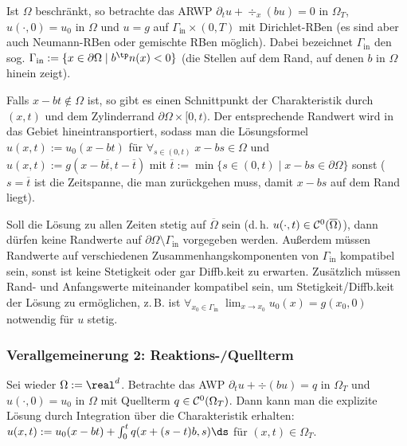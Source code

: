 \begin{Bem}
    Ist $\Omega$ beschränkt, so betrachte das ARWP
    $\partial_t u + \div_x(bu) = 0$ in $\Omega_T$,
    $u(\cdot, 0) = u_0$ in $\Omega$ und
    $u = g$ auf $\Gamma_\text{in} \times (0, T)$
    mit Dirichlet-RBen (es sind aber auch Neumann-RBen oder gemischte RBen möglich).
    Dabei bezeichnet $\Gamma_\text{in}$ den sog. 
    $\Gamma_\text{in} := \{x \in \partial\Omega \;|\; b^\tp n(x) < 0\}$
    (die Stellen auf dem Rand, auf denen $b$ in $\Omega$ hinein zeigt).
    
    Falls $x - bt \notin \Omega$ ist, so gibt es einen Schnittpunkt der Charakteristik durch
    $(x, t)$ und dem Zylinderrand $\partial\Omega \times [0, t)$.
    Der entsprechende Randwert wird in das Gebiet hineintransportiert, sodass man die Lösungsformel
    $u(x, t) := u_0(x - bt)$ für $\forall_{s \in (0, t)}\; x - bs \in \Omega$ und\\
    $u(x, t) := g(x - b\overline{t}, t - \overline{t})$ mit
    $\overline{t} := \min\{s \in (0, t) \;|\; x - bs \in \partial\Omega\}$ sonst
    ($s = \overline{t}$ ist die Zeitspanne, die man zurückgehen muss, damit $x - bs$ auf dem Rand
    liegt).
    
    Soll die Lösung zu allen Zeiten stetig auf $\overline{\Omega}$ sein
    (d.\,h. $u(\cdot, t) \in \mathcal{C}^0(\overline{\Omega})$), dann dürfen keine Randwerte auf
    $\partial\Omega \setminus \Gamma_\text{in}$ vorgegeben werden.
    Außerdem müssen Randwerte auf verschiedenen Zusammenhangskomponenten von $\Gamma_\text{in}$
    kompatibel sein, sonst ist keine Stetigkeit oder gar Diffb.keit zu erwarten.
    Zusätzlich müssen Rand- und Anfangswerte miteinander kompatibel sein, um Stetigkeit/Diffb.keit
    der Lösung zu ermöglichen, z.\,B. ist
    $\forall_{x_0 \in \Gamma_\text{in}}\; \lim_{x \to x_0} u_0(x) = g(x_0, 0)$
    notwendig für $u$ stetig.
\end{Bem}

\subsubsection{%
    Verallgemeinerung 2: Reaktions-/Quellterm%
}

\begin{Bem}
    Sei wieder $\Omega := \real^d$.
    Betrachte das AWP $\partial_t u + \div(bu) = q$ in $\Omega_T$ und $u(\cdot, 0) = u_0$ in
    $\Omega$ mit Quellterm $q \in \mathcal{C}^0(\Omega_T)$.
    Dann kann man die explizite Lösung durch Integration über die Charakteristik erhalten:
    $u(x, t) := u_0(x - bt) + \int_0^t q(x + (s-t)b, s)\ds$ für $(x, t) \in \Omega_T$.
\end{Bem}

